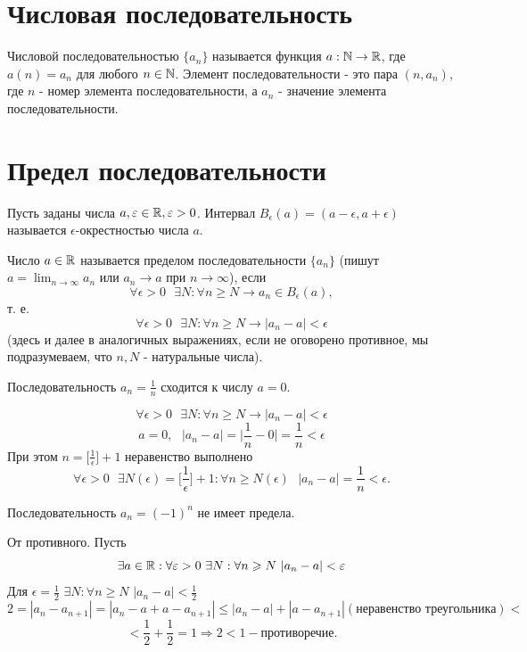 	\section{Числовая последовательность}
	
	\begin{definition}
		Числовой последовательностью $\{a_n\}$ называется функция $a : \mathbb N \rightarrow \mathbb R$, где $a(n) = a_n$ для любого $n \in \mathbb N$. Элемент
		последовательности - это пара $(n, a_n)$, где $n$ - номер элемента
		последовательности, а $a_n$ - значение элемента последовательности.
	\end{definition}
	
	\section{Предел последовательности}
	
	\begin{definition}
		Пусть заданы числа $a, \varepsilon \in \mathbb R, \varepsilon > 0$. Интервал  $B_{\epsilon}(a) = (a - \epsilon, a + \epsilon)$ называется $\epsilon$-окрестностью числа $a$.
	\end{definition}
	
	\begin{definition}
		Число $a \in \mathbb R$ называется пределом последовательности $\{a_n\}$ (пишут $a = \lim_{n \to \infty} a_n$ или $a_n \to a$ при $n \to \infty$), если
		\[ \forall \epsilon > 0 \text{ } \exists N : \forall n \geqslant N \rightarrow a_n \in B_{\epsilon}(a), \]
		т. е.
		\[ \forall \epsilon > 0 \text{ } \exists N : \forall n \geqslant N \rightarrow |a_n - a| < \epsilon \]
		(здесь и далее в аналогичных выражениях, если не оговорено противное, мы подразумеваем, что $n, N$ - натуральные числа).
	\end{definition}
	
	\begin{example}
		Последовательность $a_n = \frac{1}{n}$ сходится к числу $a = 0$.
	\end{example}
	\[ \forall \epsilon > 0 \text{ } \exists N : \forall n \geqslant N \rightarrow |a_n - a| < \epsilon \]
	\[ a = 0, \text{ } |a_n - a| = \bigg|\frac{1}{n} - 0\bigg| = \frac{1}{n} < \epsilon \]
	При этом $n = \big[\frac{1}{\epsilon}\big] + 1$ неравенство выполнено
	\[ \forall \epsilon > 0 \text{ } \exists N(\epsilon) = \bigg[\frac{1}{\epsilon}\bigg] + 1 : \forall n \geqslant N(\epsilon) \text{ } |a_n - a| = \frac{1}{n} < \epsilon. \]
	
	\begin{example}
		Последовательность $a_n = (-1)^n$ не имеет предела.
	\end{example}
	От противного. Пусть
	\[ \exists a \in \mathbb R : \forall \varepsilon > 0 \text{ } \exists N : \forall n \geqslant N \text{ } |a_n - a| < \varepsilon \]
	Для $\epsilon = \frac{1}{2}$ $\exists N: \forall n \geqslant N$ $|a_n - a| < \frac{1}{2}$
	\[ 2 = |a_n - a_{n + 1}| = |a_n - a + a - a_{n + 1}| \leqslant |a_n - a| + |a - a_{n + 1}| (\text{неравенство треугольника}) < \]
	\[ < \frac{1}{2} + \frac{1}{2} = 1 \Rightarrow 2 < 1 - \text{противоречие}. \]
	
